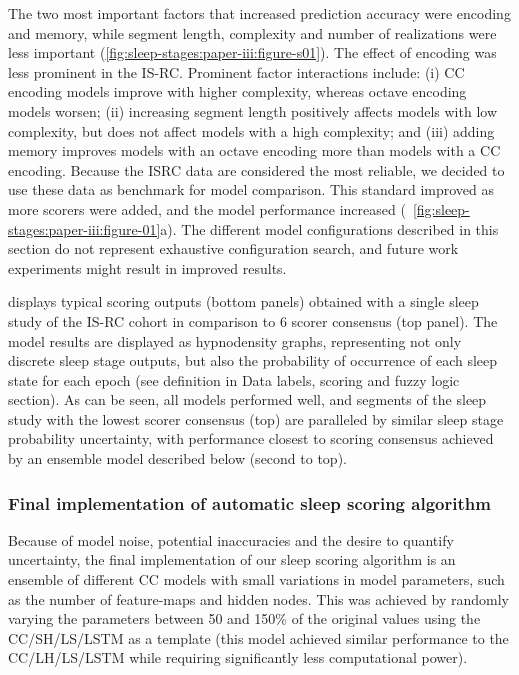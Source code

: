 The two most important factors that increased prediction accuracy were encoding and memory, while segment length, complexity and number of realizations were less important (\cref{fig:sleep-stages:paper-iii:figure-s01}).
The effect of encoding was less prominent in the \ac{IS-RC}.
Prominent factor interactions include: (i) \ac{CC} encoding models improve with higher complexity, whereas octave encoding models worsen; (ii) increasing segment length positively affects models with low complexity, but does not affect models with a high complexity; and (iii) adding memory improves models with an octave encoding more than models with a \ac{CC} encoding.
Because the ISRC data are considered the most reliable, we decided to use these data as benchmark for model comparison.
This standard improved as more scorers were added, and the model performance increased (~\cref{fig:sleep-stages:paper-iii:figure-01}a).
The different model configurations described in this section do not represent exhaustive configuration search, and future work experiments might result in improved results.

 displays typical scoring outputs (bottom panels) obtained with a single sleep study of the \ac{IS-RC} cohort in comparison to 6 scorer consensus (top panel).
The model results are displayed as hypnodensity graphs, representing not only discrete sleep stage outputs, but also the probability of occurrence of each sleep state for each epoch (see definition in Data labels, scoring and fuzzy logic section).
As can be seen, all models performed well, and segments of the sleep study with the lowest scorer consensus (top) are paralleled by similar sleep stage probability uncertainty, with performance closest to scoring consensus achieved by an ensemble model described below (second to top).

\subsubsection{Final implementation of automatic sleep scoring algorithm}
Because of model noise, potential inaccuracies and the desire to quantify uncertainty, the final implementation of our sleep
scoring algorithm is an ensemble of different \ac{CC} models with
small variations in model parameters, such as the number of
feature-maps and hidden nodes.
This was achieved by randomly varying the parameters between 50 and 150\% of the original values using the \ac{CC}/SH/LS/\ac{LSTM} as a template (this model achieved similar performance to the \ac{CC}/LH/LS/\ac{LSTM} while requiring significantly less computational power).

